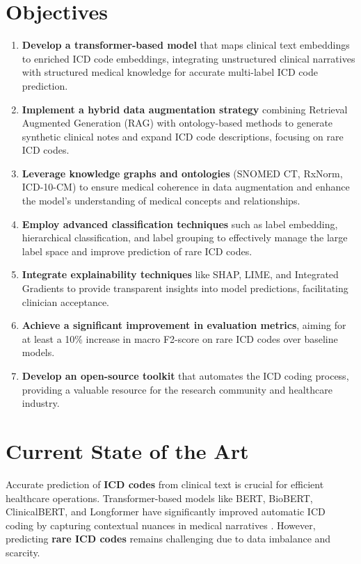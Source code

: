 \documentclass[10pt,a4paper]{article}
\begin{document}
\section{Objectives}
\begin{enumerate}
    \item \textbf{Develop a transformer-based model} that maps clinical text embeddings to enriched ICD code embeddings, integrating unstructured clinical narratives with structured medical knowledge for accurate multi-label ICD code prediction.
    \item \textbf{Implement a hybrid data augmentation strategy} combining Retrieval Augmented Generation (RAG) with ontology-based methods to generate synthetic clinical notes and expand ICD code descriptions, focusing on rare ICD codes.
    \item \textbf{Leverage knowledge graphs and ontologies} (SNOMED CT, RxNorm, ICD-10-CM) to ensure medical coherence in data augmentation and enhance the model's understanding of medical concepts and relationships.
    \item \textbf{Employ advanced classification techniques} such as label embedding, hierarchical classification, and label grouping to effectively manage the large label space and improve prediction of rare ICD codes.
    \item \textbf{Integrate explainability techniques} like SHAP, LIME, and Integrated Gradients to provide transparent insights into model predictions, facilitating clinician acceptance.
    \item \textbf{Achieve a significant improvement in evaluation metrics}, aiming for at least a 10\% increase in macro F2-score on rare ICD codes over baseline models.
    \item \textbf{Develop an open-source toolkit} that automates the ICD coding process, providing a valuable resource for the research community and healthcare industry.
\end{enumerate}

\section{Current State of the Art}
Accurate prediction of \textbf{ICD codes} from clinical text is crucial for efficient healthcare operations. Transformer-based models like BERT, BioBERT, ClinicalBERT, and Longformer have significantly improved automatic ICD coding by capturing contextual nuances in medical narratives \cite{si2019enhancing, sheu2022survey}. However, predicting \textbf{rare ICD codes} remains challenging due to data imbalance and scarcity.
\end{document}
